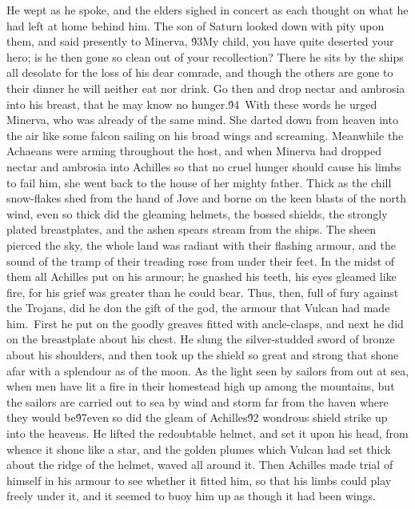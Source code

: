 {He wept as he spoke, and the elders sighed in concert as each thought on what he had left at home behind him. The son of Saturn looked down with pity upon them, and said presently to Minerva, \'93My child, you have quite deserted your hero; is he then gone so clean out of your recollection? There he sits by the ships all desolate for the loss of his dear comrade, and though the others are gone to their dinner he will neither eat nor drink. Go then and drop nectar and ambrosia into his breast, that he may know no hunger.\'94\
With these words he urged Minerva, who was already of the same mind. She darted down from heaven into the air like some falcon sailing on his broad wings and screaming. Meanwhile the Achaeans were arming throughout the host, and when Minerva had dropped nectar and ambrosia into Achilles so that no cruel hunger should cause his limbs to fail him, she went back to the house of her mighty father. Thick as the chill snow-flakes shed from the hand of Jove and borne on the keen blasts of the north wind, even so thick did the gleaming helmets, the bossed shields, the strongly plated breastplates, and the ashen spears stream from the ships. The sheen pierced the sky, the whole land was radiant with their flashing armour, and the sound of the tramp of their treading rose from under their feet. In the midst of them all Achilles put on his armour; he gnashed his teeth, his eyes gleamed like fire, for his grief was greater than he could bear. Thus, then, full of fury against the Trojans, did he don the gift of the god, the armour that Vulcan had made him.\
First he put on the goodly greaves fitted with ancle-clasps, and next he did on the breastplate about his chest. He slung the silver-studded sword of bronze about his shoulders, and then took up the shield so great and strong that shone afar with a splendour as of the moon. As the light seen by sailors from out at sea, when men have lit a fire in their homestead high up among the mountains, but the sailors are carried out to sea by wind and storm far from the haven where they would be\'97even so did the gleam of Achilles\'92 wondrous shield strike up into the heavens. He lifted the redoubtable helmet, and set it upon his head, from whence it shone like a star, and the golden plumes which Vulcan had set thick about the ridge of the helmet, waved all around it. Then Achilles made trial of himself in his armour to see whether it fitted him, so that his limbs could play freely under it, and it seemed to buoy him up as though it had been wings.\
}
